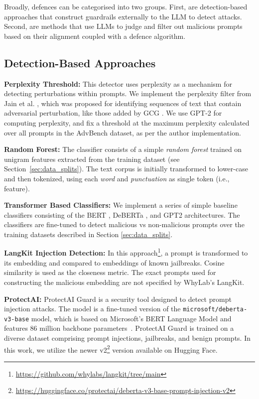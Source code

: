 
Broadly, defences can be categorised into two groups. First, are detection-based approaches that construct guardrails externally to the LLM to detect attacks. Second, are methods that use LLMs to judge and filter out malicious prompts based on their alignment coupled with a defence algorithm.

\subsection{Detection-Based Approaches}

\noindent\textbf{Perplexity Threshold:} This detector uses perplexity as a mechanism for detecting perturbations within prompts. We implement the perplexity filter from Jain et al. \cite{jain2023baseline}, which was proposed for identifying sequences of text that contain adversarial perturbation, like those added by GCG \cite{zou2023universal}. We use GPT-2 for computing perplexity, and fix a threshold at the maximum perplexity calculated over all prompts in the AdvBench dataset, as per the author implementation.

\noindent\textbf{Random Forest:} The classifier consists of a simple {\em random forest} trained on unigram features extracted from the training dataset (see Section~\ref{sec:data_splits}). The text corpus is initially transformed to lower-case and then tokenized, using each \textit{word} and \textit{punctuation} as single token (i.e., feature).

\noindent\textbf{Transformer Based Classifiers:} We implement a series of simple baseline classifiers consisting of the BERT \cite{bert}, DeBERTa \cite{deberta}, and GPT2 \cite{gpt2_link} architectures. The classifiers are fine-tuned to detect malicious vs non-malicious prompts over the training datasets described in Section \ref{sec:data_splits}.

\noindent\textbf{LangKit Injection Detection:} In this approach\footnote{\url{https://github.com/whylabs/langkit/tree/main}}, a prompt is transformed to its embedding and compared to embeddings of known jailbreaks. Cosine similarity is used as the closeness metric. The exact prompts used for constructing the malicious embedding are not specified by WhyLab's LangKit.

\noindent\textbf{ProtectAI:}
ProtectAI Guard is a security tool designed to detect prompt injection attacks. The model is a fine-tuned version of the {\tt microsoft/deberta-v3-base}\label{deberta} model, which is based on Microsoft's BERT Language Model and features 86 million backbone parameters~\cite{he2021deberta}. ProtectAI Guard is trained on a diverse dataset comprising prompt injections, jailbreaks, and benign prompts.  In this work, we utilize the newer v2\footnote{\url{https://huggingface.co/protectai/deberta-v3-base-prompt-injection-v2}} version available on Hugging Face.

